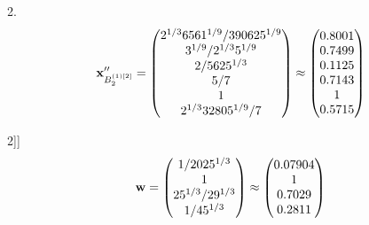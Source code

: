 \documentclass[10pt,a4paper]{article}
\begin{document}
	2.
	\[
		\bold{x}''_{B_2^{(1)[2]}} = 
		\begin{pmatrix}
			{{2^ {1 / 3}}{6561^ {1 / 9}}} / {{390625^ {1 / 9}}} \\
			{{3^ {1 / 9}}} / {{2^ {1 / 3}}{5^ {1 / 9}}} \\
			{{2}} / {{5625^ {1 / 3}}} \\
			{{5}} / {{7}} \\
			{1}{} \\
			{{2^ {1 / 3}}{32805^ {1 / 9}}} / {{7}} \\
		\end{pmatrix}
		\approx
		\begin{pmatrix}
			0.8001   \\
			0.7499   \\
			0.1125   \\
			0.7143   \\
			1        \\
			0.5715   \\
		\end{pmatrix}
	\]

2]]
	\[
		\bold{w} = 
		\begin{pmatrix}
			{1} / {{2025^ {1 / 3}}} \\
			{1}{} \\
			{{25^ {1 / 3}}} / {{2}{9^ {1 / 3}}} \\
			{1} / {{45^ {1 / 3}}} \\
		\end{pmatrix}
		\approx
		\begin{pmatrix}
			0.07904  \\
			1        \\
			0.7029   \\
			0.2811   \\
		\end{pmatrix}
	\]
\end{document}
